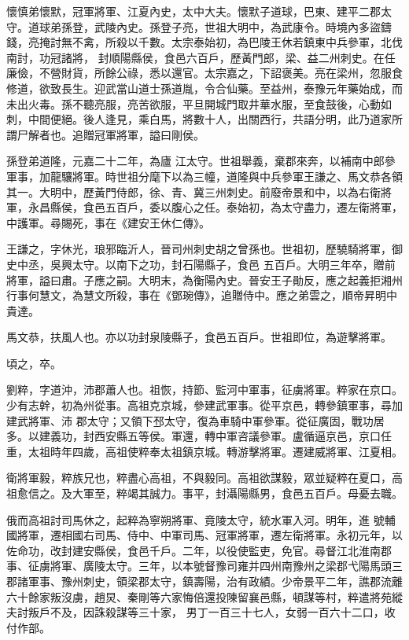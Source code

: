 \begin{pinyinscope}
 懷慎弟懷默，冠軍將軍、江夏內史，太中大夫。懷默子道球，巴東、建平二郡太守。道球弟孫登，武陵內史。孫登子亮，世祖大明中，為武康令。時境內多盜鑄錢，亮掩討無不禽，所殺以千數。太宗泰始初，為巴陵王休若鎮東中兵參軍，北伐南討，功冠諸將，
 封順陽縣侯，食邑六百戶，歷黃門郎，梁、益二州刺史。在任廉儉，不營財貨，所餘公祿，悉以還官。太宗嘉之，下詔褒美。亮在梁州，忽服食修道，欲致長生。迎武當山道士孫道胤，令合仙藥。至益州，泰豫元年藥始成，而未出火毒。孫不聽亮服，亮苦欲服，平旦開城門取井華水服，至食鼓後，心動如刺，中間便絕。後人逢見，乘白馬，將數十人，出關西行，共語分明，此乃道家所謂尸解者也。追贈冠軍將軍，謚曰剛侯。



 孫登弟道隆，元嘉二十二年，為廬
 江太守。世祖舉義，棄郡來奔，以補南中郎參軍事，加龍驤將軍。時世祖分麾下以為三幢，道隆與中兵參軍王謙之、馬文恭各領其一。大明中，歷黃門侍郎，徐、青、冀三州刺史。前廢帝景和中，以為右衛將軍，永昌縣侯，食邑五百戶，委以腹心之任。泰始初，為太守盡力，遷左衛將軍，中護軍。尋賜死，事在《建安王休仁傳》。



 王謙之，字休光，琅邪臨沂人，晉司州刺史胡之曾孫也。世祖初，歷驍騎將軍，御史中丞，吳興太守。以南下之功，封石陽縣子，食邑
 五百戶。大明三年卒，贈前將軍，謚曰肅。子應之嗣。大明末，為衡陽內史。晉安王子勛反，應之起義拒湘州行事何慧文，為慧文所殺，事在《鄧琬傳》，追贈侍中。應之弟雲之，順帝昇明中貴達。



 馬文恭，扶風人也。亦以功封泉陵縣子，食邑五百戶。世祖即位，為遊擊將軍。



 頃之，卒。



 劉粹，字道沖，沛郡蕭人也。祖恢，持節、監河中軍事，征虜將軍。粹家在京口。少有志幹，初為州從事。高祖克京城，參建武軍事。從平京邑，轉參鎮軍事，尋加建武將軍、沛
 郡太守；又領下邳太守，復為車騎中軍參軍。從征廣固，戰功居多。以建義功，封西安縣五等侯。軍還，轉中軍咨議參軍。盧循逼京邑，京口任重，太祖時年四歲，高祖使粹奉太祖鎮京城。轉游擊將軍。遷建威將軍、江夏相。



 衛將軍毅，粹族兄也，粹盡心高祖，不與毅同。高祖欲謀毅，眾並疑粹在夏口，高祖愈信之。及大軍至，粹竭其誠力。事平，封灄陽縣男，食邑五百戶。母憂去職。



 俄而高祖討司馬休之，起粹為寧朔將軍、竟陵太守，統水軍入河。明年，進
 號輔國將軍，遷相國右司馬、侍中、中軍司馬、冠軍將軍，遷左衛將軍。永初元年，以佐命功，改封建安縣侯，食邑千戶。二年，以役使監吏，免官。尋督江北淮南郡事、征虜將軍、廣陵太守。三年，以本號督豫司雍并四州南豫州之梁郡弋陽馬頭三郡諸軍事、豫州刺史，領梁郡太守，鎮壽陽，治有政績。少帝景平二年，譙郡流離六十餘家叛沒虜，趙炅、秦剛等六家悔倍還投陳留襄邑縣，頓謀等村，粹遣將苑縱夫討叛戶不及，因誅殺謀等三十家，
 男丁一百三十七人，女弱一百六十二口，收付作部。




\end{pinyinscope}
